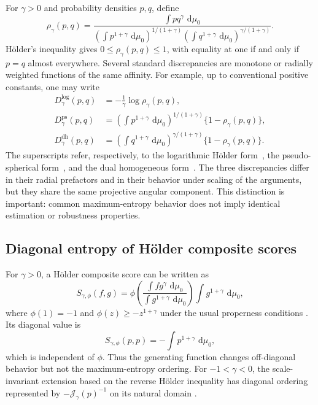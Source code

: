 \documentclass[pdflatex,sn-mathphys-num]{sn-jnl}
\theoremstyle{thmstyleone}
\theoremstyle{thmstyletwo}
\theoremstyle{thmstylethree}
\newcommand{\dd}{\,\mathrm{d}}
\newcommand{\calJ}{\mathcal{J}}
\begin{document}
For $\gamma>0$ and probability densities $p,q$, define
\begin{equation}
 \rho_\gamma(p,q)
 =
 \frac{\int p q^\gamma\,\dd\mu_0}
 {\left(\int p^{1+\gamma}\,\dd\mu_0\right)^{1/(1+\gamma)}
  \left(\int q^{1+\gamma}\,\dd\mu_0\right)^{\gamma/(1+\gamma)}}.
\label{eq:holder-affinity}
\end{equation}
H\"older's inequality gives $0\leq\rho_\gamma(p,q)\leq1$, with equality at one if and only if $p=q$ almost everywhere. Several standard discrepancies are monotone or radially weighted functions of the same affinity. For example, up to conventional positive constants, one may write
\begin{align}
 D_\gamma^{\log}(p,q)
 &= -\frac{1}{\gamma}\log\rho_\gamma(p,q),
\label{eq:log-holder-div}\\
 D_\gamma^{\mathrm{ps}}(p,q)
 &= \left(\int p^{1+\gamma}\,\dd\mu_0\right)^{1/(1+\gamma)}
    \{1-\rho_\gamma(p,q)\},
\label{eq:ps-div}\\
 D_\gamma^{\mathrm{dh}}(p,q)
 &= \left(\int q^{1+\gamma}\,\dd\mu_0\right)^{\gamma/(1+\gamma)}
    \{1-\rho_\gamma(p,q)\}.
\label{eq:dual-hom-div}
\end{align}
The superscripts refer, respectively, to the logarithmic H\"older form~\citep{FujisawaEguchi2008}, the pseudo-spherical form~\citep{Good1971}, and the dual homogeneous form~\citep{HinoEguchi2023}. The three discrepancies differ in their radial prefactors and in their behavior under scaling of the arguments, but they share the same projective angular component. This distinction is important: common maximum-entropy behavior does not imply identical estimation or robustness properties.

\subsection{Diagonal entropy of H\"older composite scores}

For $\gamma>0$, a H\"older composite score can be written as
\begin{equation}
 S_{\gamma,\phi}(f,g)
 =
 \phi\!\left(
 \frac{\int f g^\gamma\,\dd\mu_0}
 {\int g^{1+\gamma}\,\dd\mu_0}
 \right)
 \int g^{1+\gamma}\,\dd\mu_0,
\label{eq:holder-score}
\end{equation}
where $\phi(1)=-1$ and $\phi(z)\geq-z^{1+\gamma}$ under the usual properness conditions \citep{KanamoriFujisawa2014Bernoulli}. Its diagonal value is
\begin{equation}
 S_{\gamma,\phi}(p,p)
 =-\int p^{1+\gamma}\,\dd\mu_0,
\label{eq:holder-diagonal}
\end{equation}
which is independent of $\phi$. Thus the generating function changes off-diagonal behavior but not the maximum-entropy ordering. For $-1<\gamma<0$, the scale-invariant extension based on the reverse H\"older inequality has diagonal ordering represented by $-\calJ_\gamma(p)^{-1}$ on its natural domain \citep{Kanamori2014Entropy}.
\end{document}
